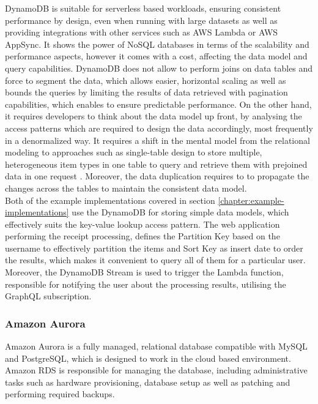 DynamoDB is suitable for serverless based workloads, ensuring consistent performance by design, even when running with large datasets as well as providing integrations with other services such as AWS Lambda or AWS AppSync.
It shows the power of NoSQL databases in terms of the scalability and performance aspects, however it comes with a cost, affecting the data model and query capabilities.
DynamoDB does not allow to perform joins on data tables and force to segment the data, which allows easier, horizontal scaling as well as bounds the queries by limiting the results of data retrieved with pagination capabilities, which enables to ensure predictable performance.
On the other hand, it requires developers to think about the data model up front, by analysing the access patterns which are required to design the data accordingly, most frequently in a denormalized way.
It requires a shift in the mental model from the relational modeling to approaches such as single-table design to store multiple, heterogeneous item types in one table to query and retrieve them with prejoined data in one request \cite{SQLNoSQLandScaleHowDynamoDBScalesWhereRelationalDatabasesDont}.
Moreover, the data duplication requires to to propagate the changes across the tables to maintain the consistent data model. \\

Both of the example implementations covered in section \ref{chapter:example-implementations} use the DynamoDB for storing simple data models, which effectively suits the key-value lookup access pattern.
The web application performing the receipt processing, defines the Partition Key based on the username to effectively partition the items and Sort Key as insert date to order the results, which makes it convenient to query all of them for a particular user.
Moreover, the DynamoDB Stream is used to trigger the Lambda function, responsible for notifying the user about the processing results, utilising the GraphQL subscription.

\subsubsection{Amazon Aurora}

Amazon Aurora \cite{Aurora} is a fully managed, relational database compatible with MySQL and PostgreSQL, which is designed to work in the cloud based environment.
Amazon RDS is responsible for managing the database, including administrative tasks such as hardware provisioning, database setup as well as patching and performing required backups.

